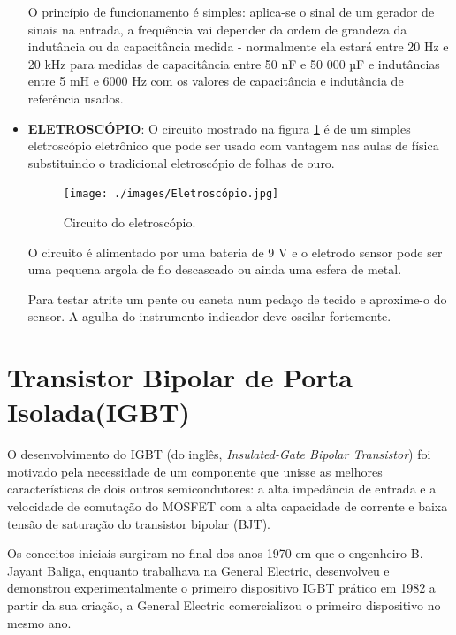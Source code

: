 \documentclass[12pt]{article}
\begin{document}
\begin{itemize}
\begin{figure}[htpb!]
                    \end{figure}

                O princípio de funcionamento é simples: aplica-se o sinal de um gerador de sinais na entrada, a frequência vai depender da ordem de grandeza da indutância ou da capacitância medida - normalmente ela estará entre 20 Hz e 20 kHz para medidas de capacitância entre 50 nF e 50 000 µF e indutâncias entre 5 mH e 6000 Hz com os valores de capacitância e indutância de referência usados.

                \item \textbf{ELETROSCÓPIO}: O circuito mostrado na figura \ref{fig:Eletroscópio} é de um simples eletroscópio eletrônico que pode ser usado com vantagem nas aulas de física substituindo o tradicional eletroscópio de folhas de ouro.

                    \begin{figure}[htpb!]

                        \centering
                        \texttt{[image: ./images/Eletroscópio.jpg]}
                        \caption{Circuito do eletroscópio.}
                        \label{fig:Eletroscópio}

                    \end{figure}

                O circuito é alimentado por uma bateria de 9 V e o eletrodo sensor pode ser uma pequena argola de fio descascado ou ainda uma esfera de metal.

                Para testar atrite um pente ou caneta num pedaço de tecido e aproxime-o do sensor. A agulha do instrumento indicador deve oscilar fortemente.

            \end{itemize}

\section{Transistor Bipolar de Porta Isolada(IGBT)}

        O desenvolvimento do IGBT (do inglês, \textit{Insulated-Gate Bipolar Transistor}) foi motivado pela necessidade de um componente que unisse as melhores características de dois outros semicondutores: a alta impedância de entrada e a velocidade de comutação do MOSFET com a alta capacidade de corrente e baixa tensão de saturação do transistor bipolar (BJT).

        Os conceitos iniciais surgiram no final dos anos 1970 em que o engenheiro {B. Jayant Baliga}, enquanto trabalhava na General Electric, desenvolveu e demonstrou experimentalmente o primeiro dispositivo IGBT prático em 1982 a partir da sua criação, a General Electric comercializou o primeiro dispositivo no mesmo ano.
\end{document}
